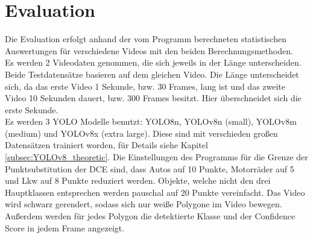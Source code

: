 \chapter{Evaluation}
\label{ch:Evaluation}

{
	Die Evaluation erfolgt anhand der vom Programm berechneten statistischen Auswertungen für verschiedene Videos mit den beiden Berechnungsmethoden. \\
	Es werden 2 Videodaten genommen, die sich jeweils in der Länge unterscheiden. Beide Testdatensätze basieren auf dem gleichen Video. Die Länge unterscheidet sich, da das erste Video 1 Sekunde, bzw. 30 Frames, lang ist und das zweite Video 10 Sekunden dauert, bzw. 300 Frames besitzt. Hier überschneidet sich die erste Sekunde. \\
	Es werden 3 YOLO Modelle benutzt: YOLO8n, YOLOv8n (small), YOLOv8m (medium) und YOLOv8x (extra large). Diese sind mit verschieden großen Datensätzen trainiert worden, für Details siehe Kapitel \ref{subsec:YOLOv8_theoretic}.
	Die Einstellungen des Programms für die Grenze der Punktsubstitution der DCE sind, dass Autos auf 10 Punkte, Motorräder auf 5 und Lkw auf 8 Punkte reduziert werden.
	Objekte, welche nicht den drei Hauptklassen entsprechen werden pauschal auf 20 Punkte vereinfacht. Das Video wird  schwarz gerendert, sodass sich nur weiße Polygone im Video bewegen. Außerdem werden für jedes Polygon die detektierte Klasse und der Confidence Score in jedem Frame angezeigt.

}
